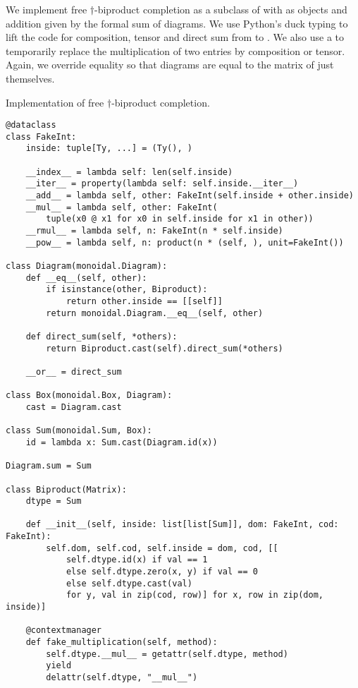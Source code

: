 We implement free $\dagger$-biproduct completion as a subclass of  with  as objects and addition given by the formal sum of diagrams.
We use Python's duck typing to lift the code for composition, tensor and direct sum from  to .
We also use a  to temporarily replace the multiplication of two  entries by composition or tensor.
Again, we override equality so that diagrams are equal to the matrix of just themselves.

\begin{python}
{\normalfont Implementation of free $\dagger$-biproduct completion.}

\begin{verbatim}
@dataclass
class FakeInt:
    inside: tuple[Ty, ...] = (Ty(), )

    __index__ = lambda self: len(self.inside)
    __iter__ = property(lambda self: self.inside.__iter__)
    __add__ = lambda self, other: FakeInt(self.inside + other.inside)
    __mul__ = lambda self, other: FakeInt(
        tuple(x0 @ x1 for x0 in self.inside for x1 in other))
    __rmul__ = lambda self, n: FakeInt(n * self.inside)
    __pow__ = lambda self, n: product(n * (self, ), unit=FakeInt())

class Diagram(monoidal.Diagram):
    def __eq__(self, other):
        if isinstance(other, Biproduct):
            return other.inside == [[self]]
        return monoidal.Diagram.__eq__(self, other)

    def direct_sum(self, *others):
        return Biproduct.cast(self).direct_sum(*others)

    __or__ = direct_sum

class Box(monoidal.Box, Diagram):
    cast = Diagram.cast

class Sum(monoidal.Sum, Box):
    id = lambda x: Sum.cast(Diagram.id(x))

Diagram.sum = Sum

class Biproduct(Matrix):
    dtype = Sum

    def __init__(self, inside: list[list[Sum]], dom: FakeInt, cod: FakeInt):
        self.dom, self.cod, self.inside = dom, cod, [[
            self.dtype.id(x) if val == 1
            else self.dtype.zero(x, y) if val == 0
            else self.dtype.cast(val)
            for y, val in zip(cod, row)] for x, row in zip(dom, inside)]

    @contextmanager
    def fake_multiplication(self, method):
        self.dtype.__mul__ = getattr(self.dtype, method)
        yield
        delattr(self.dtype, "__mul__")


\end{verbatim}
\end{python}
